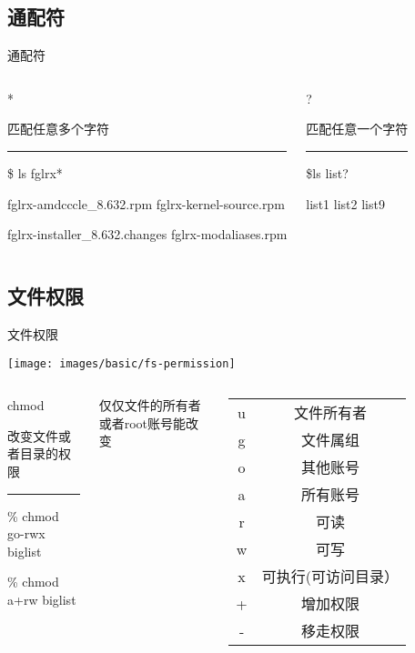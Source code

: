 \subsection{通配符}


\begin{frame}{通配符}
\begin{columns}%


\column{5cm}
\begin{exampleblock}
{*}

匹配任意多个字符\\
\rule[0.5ex]{1\linewidth}{1pt}

\$ ls fglrx{*}

fglrx-amdcccle\_8.632.rpm fglrx-kernel-source.rpm

fglrx-installer\_8.632.changes fglrx-modaliases.rpm
\end{exampleblock}

\column{5cm}
\begin{exampleblock}
? 

匹配任意一个字符

\noindent \rule[0.5ex]{1\linewidth}{1pt}

\$ls list?

list1 list2 list9
\end{exampleblock}
\end{columns}%

\end{frame}

\subsection{文件权限}


\begin{frame}[allowframebreaks]{文件权限}

\texttt{[image: images/basic/fs-permission]}


\begin{columns}%


\column{5cm}
\begin{exampleblock}
{chmod }

改变文件或者目录的权限

\noindent \rule[0.5ex]{1\linewidth}{1pt}

\% chmod go-rwx biglist 

\% chmod a+rw biglist \end{exampleblock}
\begin{alertblock}
{仅仅文件的所有者或者root账号能改变}
\end{alertblock}

\column{5cm}


\begin{tabular}{cc}
\hline 
u & 文件所有者\tabularnewline
g & 文件属组\tabularnewline
o & 其他账号\tabularnewline
a & 所有账号\tabularnewline
r & 可读\tabularnewline
w & 可写\tabularnewline
x & 可执行(可访问目录）\tabularnewline
+ & 增加权限\tabularnewline
- & 移走权限\tabularnewline
\hline 
\end{tabular}

\end{columns}%

\end{frame}

